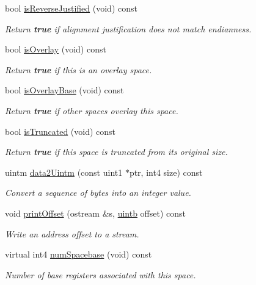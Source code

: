 \begin{DoxyCompactItemize}
bool \mbox{\hyperlink{class_addr_space_aea27d2d0e9b150a4f884fb029eaefbf6}{is\+Reverse\+Justified}} (void) const
\begin{DoxyCompactList}\small\item\em Return {\bfseries{true}} if alignment justification does not match endianness. \end{DoxyCompactList}\item 
bool \mbox{\hyperlink{class_addr_space_ad81b44bbbe7c6b561a7985aa23f3bd0d}{is\+Overlay}} (void) const
\begin{DoxyCompactList}\small\item\em Return {\bfseries{true}} if this is an overlay space. \end{DoxyCompactList}\item 
bool \mbox{\hyperlink{class_addr_space_a66dc51ca0c5b8f2061cbbec7446e71fc}{is\+Overlay\+Base}} (void) const
\begin{DoxyCompactList}\small\item\em Return {\bfseries{true}} if other spaces overlay this space. \end{DoxyCompactList}\item 
bool \mbox{\hyperlink{class_addr_space_a06ef47bec774e59d14ab721eef35e315}{is\+Truncated}} (void) const
\begin{DoxyCompactList}\small\item\em Return {\bfseries{true}} if this space is truncated from its original size. \end{DoxyCompactList}\item 
uintm \mbox{\hyperlink{class_addr_space_abc38c574b8b642960723ad1c50793c34}{data2\+Uintm}} (const uint1 $\ast$ptr, int4 size) const
\begin{DoxyCompactList}\small\item\em Convert a sequence of bytes into an integer value. \end{DoxyCompactList}\item 
void \mbox{\hyperlink{class_addr_space_aac551de6286f9260153c1d7d1bacdab8}{print\+Offset}} (ostream \&s, \mbox{\hyperlink{types_8h_a2db313c5d32a12b01d26ac9b3bca178f}{uintb}} offset) const
\begin{DoxyCompactList}\small\item\em Write an address offset to a stream. \end{DoxyCompactList}\item 
virtual int4 \mbox{\hyperlink{class_addr_space_a1bc0bc963f33dedb721489497a92c2e3}{num\+Spacebase}} (void) const
\begin{DoxyCompactList}\small\item\em Number of base registers associated with this space. \end{DoxyCompactList}\item 

\end{DoxyCompactItemize}
